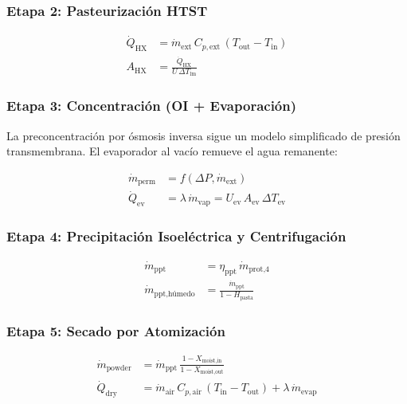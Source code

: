 \documentclass[10pt,letterpaper]{article}
\begin{document}
\subsubsection{Etapa 2: Pasteurizaci\'on HTST}

\begin{align}
\dot{Q}_{\text{HX}} &= \dot{m}_{\text{ext}} \, C_{p,\text{ext}} \, (T_{\text{out}} - T_{\text{in}}) \label{eq:stage2_energy} \\
A_{\text{HX}} &= \frac{\dot{Q}_{\text{HX}}}{U \, \Delta T_{\text{lm}}} \label{eq:stage2_area}
\end{align}

\subsubsection{Etapa 3: Concentraci\'on (OI + Evaporaci\'on)}

La preconcentraci\'on por \'osmosis inversa sigue un modelo simplificado de presi\'on transmembrana. El evaporador al vac\'io remueve el agua remanente:

\begin{align}
\dot{m}_{\text{perm}} &= f(\Delta P, \dot{m}_{\text{ext}}) \label{eq:stage3_ro} \\
\dot{Q}_{\text{ev}} &= \lambda \, \dot{m}_{\text{vap}} = U_{\text{ev}} \, A_{\text{ev}} \, \Delta T_{\text{ev}} \label{eq:stage3_evap}
\end{align}

\subsubsection{Etapa 4: Precipitaci\'on Isoel\'ectrica y Centrifugaci\'on}

\begin{align}
\dot{m}_{\text{ppt}} &= \eta_{\text{ppt}} \, \dot{m}_{\text{prot,4}} \label{eq:stage4_ppt} \\
\dot{m}_{\text{ppt,h\'umedo}} &= \frac{\dot{m}_{\text{ppt}}}{1 - H_{\text{pasta}}} \label{eq:stage4_paste}
\end{align}

\subsubsection{Etapa 5: Secado por Atomizaci\'on}

\begin{align}
\dot{m}_{\text{powder}} &= \dot{m}_{\text{ppt}} \, \frac{1 - X_{\text{moist,in}}}{1 - X_{\text{moist,out}}} \label{eq:stage5_mass} \\
\dot{Q}_{\text{dry}} &= \dot{m}_{\text{air}} \, C_{p,\text{air}} \, (T_{\text{in}} - T_{\text{out}}) + \lambda \, \dot{m}_{\text{evap}} \label{eq:stage5_energy}
\end{align}
\end{document}
